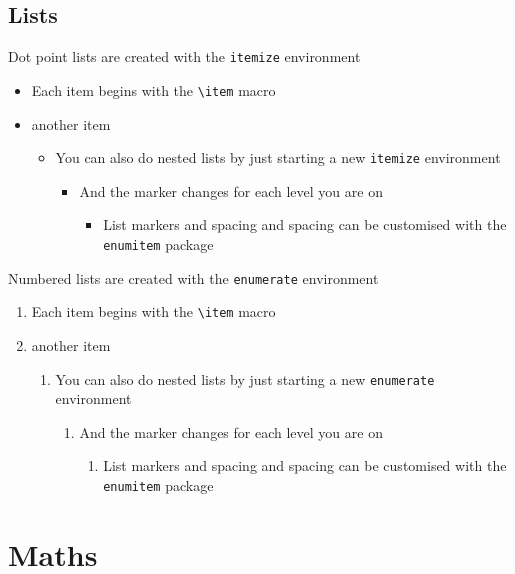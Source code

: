 \documentclass{article}
\begin{document}
\subsection{Lists}
\label{sec:lists}
Dot point lists are created with the \lstinline{itemize} environment
\begin{itemize}
  \item Each item begins with the \lstinline{\item} macro
  \item another item
    \begin{itemize}
      \item You can also do nested lists by just starting a new \lstinline{itemize} environment
        \begin{itemize}
          \item And the marker changes for each level you are on
            \begin{itemize}
              \item List markers and spacing and spacing can be customised with the \lstinline{enumitem} package
            \end{itemize}
        \end{itemize}
    \end{itemize}
\end{itemize}


Numbered lists are created with the \lstinline{enumerate} environment
\begin{enumerate}
  \item Each item begins with the \lstinline{\item} macro
  \item another item
    \begin{enumerate}
      \item You can also do nested lists by just starting a new \lstinline{enumerate} environment
        \begin{enumerate}
          \item And the marker changes for each level you are on
            \begin{enumerate}
              \item List markers and spacing and spacing can be customised with the \lstinline{enumitem} package
            \end{enumerate}
        \end{enumerate}
    \end{enumerate}
\end{enumerate}

\section{Maths}
\end{document}
